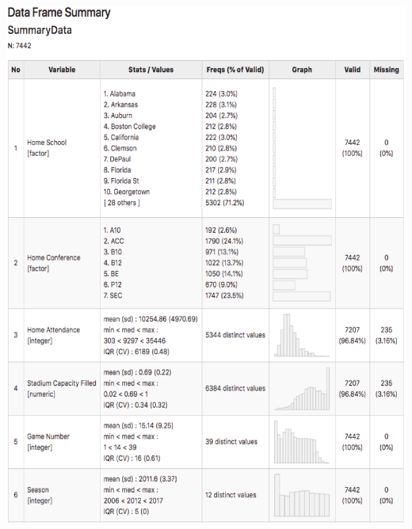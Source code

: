 \documentclass[preprint,12pt,times]{elsarticle}
\begin{document}
\includegraphics [width=\linewidth, height=21cm]{Picture7.png}
\newpage
\end{document}
